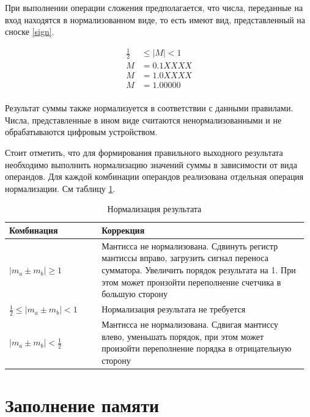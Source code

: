 \documentclass[a4paper,14pt]{extarticle}
\begin{document}
При выполнении операции сложения предполагается, что числа, переданные на вход находятся в нормализованном виде, то есть имеют вид, представленный на сноске \ref{sign}.

\begin{equation}
\begin{aligned}
\label{sign}
\frac12&\le \left|M\right|< 1\\
M &= 0.1XXXX\\
M &= 1.0XXXX\\
M&=1.00000\\
\end{aligned}
\end{equation}

Результат суммы также нормализуется в соответствии с данными правилами. Числа, представленные в ином виде считаются ненормализованными и не обрабатываются цифровым устройством.

Стоит отметить, что для формирования правильного выходного результата необходимо выполнить нормализацию значений суммы в зависимости от вида операндов. Для каждой комбинации операндов реализована отдельная операция нормализации. См таблицу \ref{tab:correction5}.

\begin{table}
	\small
	\begin{tabular}{|m{0.3\linewidth}|m{0.67\linewidth}|}
		\hline
		\textbf{Комбинация} &\textbf{Коррекция}\\
		\hline
		$\left|m_a\pm m_b\right|\ge1$ & Мантисса не нормализована. Сдвинуть регистр мантиссы вправо, загрузить сигнал переноса сумматора. Увеличить порядок результата на 1. При этом может произойти переполнение счетчика в большую сторону \\ 
		\hline
		$\frac12\le \left|m_a\pm m_b\right|< 1$ & Нормализация результата не требуется\\
		\hline
		$\left|m_a\pm m_b\right|<\frac12$ & Мантисса не нормализована. Сдвигая мантиссу влево, уменьшать порядок, при этом может произойти переполнение порядка в отрицательную сторону\\
		\hline
	\end{tabular}
	\caption{Нормализация результата}
	\label{tab:correction5}
\end{table}






\section{Заполнение памяти}
\end{document}
